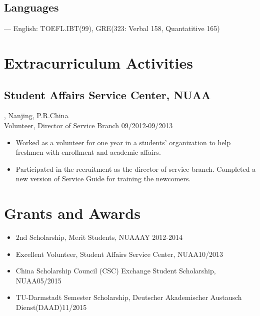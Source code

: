 \documentclass{article}
\begin{document}
\subsection{Languages}
--- English: TOEFL.IBT(99), GRE(323: Verbal 158, Quantatitive 165)

\section{Extracurriculum Activities}
\subsection{Student Affairs Service Center, NUAA}, Nanjing, P.R.China\\
Volunteer, Director of Service Branch \hfill09/2012-09/2013
\begin{itemize}[noitemsep,topsep=1pt]
\item Worked as a volunteer for one year in a students' organization to help freshmen with enrollment and academic affairs.
\item Participated in the recruitment as the director of service branch. Completed a new version of Service Guide for training the newcomers.   
\end{itemize}

\section{Grants and Awards}
\begin{itemize}[noitemsep,topsep=1pt]
\item 2nd Scholarship, Merit Students, NUAA\hfill AY 2012-2014
\item Excellent Volunteer, Student Affairs Service Center, NUAA\hfill 10/2013
\item China Scholarship Council (CSC) Exchange Student Scholarship, NUAA\hfill 05/2015
\item TU-Darmstadt Semester Scholarship, Deutscher Akademischer Austausch Dienst(DAAD)\hfill 11/2015

\end{itemize}
\end{document}
